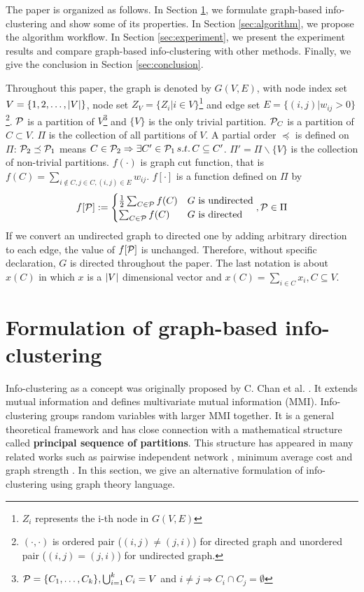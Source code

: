\documentclass{article}
\begin{document}
The paper is organized as follows. In Section \ref{sec:models}, we formulate graph-based info-clustering and show some of its properties. In Section \ref{sec:algorithm}, we propose the algorithm workflow. In Section \ref{sec:experiment}, we present the experiment results and compare graph-based info-clustering with other methods. Finally, we give the conclusion in Section \ref{sec:conclusion}.

Throughout this paper, the graph is denoted by $G(V,E)$, with node index set $V = \{1, 2, \dots, \abs{V}\}$, node set $Z_V=\{Z_i | i \in V\}$\footnote{$Z_i$ represents the i-th node in $G(V,E)$} 
 and edge set $E=\{(i,j) | w_{ij}>0\}$\footnote{$(\cdot, \cdot)$ is ordered pair ($(i,j) \neq (j,i)$) for directed graph and unordered pair ($(i,j) = (j,i)$) for undirected graph.}. $\P$ is a partition of $V$\footnote{$\P=\{C_1, \dots, C_k\}, \bigcup_{i=1}^k C_i = V$ and $i\neq j \Rightarrow C_i \cap C_j = \emptyset$} and $\{V\}$ is the only trivial partition. $\P_C$ is a partition of $C\subset V$. $\Pi$ is the collection of all partitions of $V$. A partial order $\preceq $ is defined on $\Pi$: $\P_2 \preceq \P_1$ means $C\in \P_2 \Rightarrow \exists C' \in \P_1 \,s.t.\, C \subseteq C'$. $\Pi' = \Pi \backslash \{V\}$ is the collection of non-trivial partitions. $f(\cdot)$ is graph cut function, that is $f(C) = \sum_{i\not\in C, j\in C, (i,j) \in E} w_{ij}$. $f[\cdot]$ is a function defined on $\Pi$ by
\begin{equation}
f[\P] :=
\begin{cases}
\frac{1}{2} \sum_{C\in \P}f(C)   & G \textrm{ is undirected} \\
\sum_{C\in \P}f(C)   & G \textrm{ is directed}
\end{cases},\P \in \Pi
\end{equation}
If we convert an undirected graph to directed one by adding arbitrary direction to each edge, the value of $f[\P]$ is unchanged. Therefore, without specific declaration, $G$ is directed throughout the paper. The last notation is about $x(C)$ in which $x$ is a $\abs{V}$ dimensional vector and $x(C)=\sum_{i \in C} x_i, C\subseteq V$.

\section{Formulation of graph-based info-clustering}\label{sec:models}
Info-clustering as a concept was originally proposed by C. Chan et al. \cite{RN1}.
It extends mutual information and defines multivariate mutual information (\textsf{MMI}). Info-clustering groups random variables with larger \textsf{MMI} together.   
It is a general theoretical framework and has close connection with a mathematical structure called \textbf{principal sequence of partitions}. This structure has appeared in many related works such as pairwise independent network \cite{RN9}, minimum average cost \cite{RN7} and graph strength \cite{RN12}. In this section, we give an alternative formulation of info-clustering using graph theory language.
\end{document}
